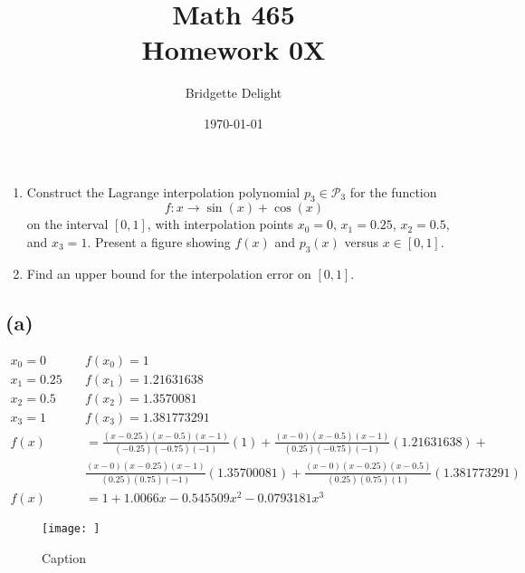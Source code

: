 \documentclass{article}
\title{{\large Math 465}\\ Homework 0X}
\author{Bridgette Delight}
\date{\today}
\begin{document}
\maketitle

\section{}
\begin{enumerate}[label = (\alph*)]
    \item  Construct the Lagrange interpolation polynomial $p_3 \in \mathcal{P}_3$ for the function
    \begin{equation*}
        f: x \to \sin(x) + \cos(x)
    \end{equation*}
    on the interval $[0, 1]$, with interpolation points $x_0 = 0$, $x_1 = 0.25$, $x_2 = 0.5$, and $x_3 = 1$. Present a figure showing $f(x)$ and $p_3(x)$ versus $x \in [0, 1]$.
    \item  Find an upper bound for the interpolation error on $[0, 1]$.
\end{enumerate}
\vspace{10mm}

\subsection*{(a)}

\begin{align*}
    x_0 = 0 \quad& f(x_0) = 1\\
    x_1 = 0.25 \quad& f(x_1) = 1.21631638\\
    x_2 = 0.5 \quad& f(x_2) = 1.3570081\\
    x_3 = 1 \quad& f(x_3) = 1.381773291\\
    f(x) &=  \frac{(x-0.25)(x-0.5)(x-1)}{(-0.25)(-0.75)(-1)}(1)
        +  \frac{(x-0)(x-0.5)(x-1)}{(0.25)(-0.75)(-1)}(1.21631638)+\\
        &  \frac{(x-0)(x-0.25)(x-1)}{(0.25)(0.75)(-1)}(1.35700081)
        +  \frac{(x-0)(x-0.25)(x-0.5)}{(0.25)(0.75)(1)}(1.381773291)\\
    f(x) &= 1 + 1.0066x - 0.545509 x^2 -0.0793181 x^3
\end{align*}

\begin{figure}
    \centering
    \texttt{[image: ]}
    \caption{Caption}
    \label{fig:my_label}
\end{figure}
\end{document}
